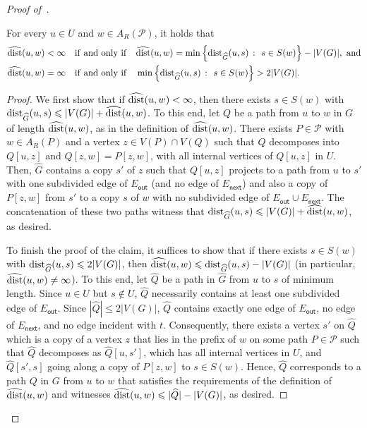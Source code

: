 \begin{proof}[Proof of~]
  \begin{claim}\label{cl:dist2}
    For every $u \in U$ and $w \in A_R(\mathcal{P})$, it holds that
    \begin{align*}
    \widehat{\dist}(u,w) < \infty &\quad\mathrm{if\ and\ only\ if} \quad \widehat{\dist}(u,w) = \min\left\{\dist_{\widehat{G}}(u,s)~\colon~s \in S(w)\right\}-|V(G)|,\ \mathrm{and}\\
    \widehat{\dist}(u,w) = \infty &\quad\mathrm{if\ and\ only\ if} \quad \min\left\{\dist_{\widehat{G}}(u,s)~\colon~s \in S(w)\right\} > 2|V(G)|.
    \end{align*}
  \end{claim}
  \begin{proof}
    We first show that if $\widehat{\mathrm{dist}}(u,w) < \infty$, then 
    there exists $s \in S(w)$ with $\mathrm{dist}_{\widehat{G}}(u,s) \leqslant |V(G)| + \widehat{\mathrm{dist}}(u,w)$. 
    To this end, let $Q$ be a path from $u$ to $w$ in $G$ of length $\widehat{\mathrm{dist}}(u,w)$, as in the definition
    of $\widehat{\mathrm{dist}}(u,w)$. There exists $P \in \mathcal{P}$ with $w \in A_R(P)$ and a vertex $z \in V(P) \cap V(Q)$
    such that $Q$ decomposes into $Q[u,z]$ and $Q[z,w] = P[z,w]$, with all internal vertices of $Q[u,z]$ in $U$. 
    Then, $\widehat{G}$ contains a copy $s'$ of $z$ such that $Q[u,z]$ projects to a path from $u$ to $s'$
    with one subdivided edge of $E_{\mathsf{out}}$ (and no edge of $E_{\mathsf{next}}$) and also a copy of $P[z,w]$ from $s'$
    to a copy $s$ of $w$ with no subdivided edge of $E_{\mathsf{out}} \cup E_{\mathsf{next}}$.
    The concatenation of these two paths witness that $\mathrm{dist}_{\widehat{G}}(u,s) \leqslant |V(G)| + \widehat{\mathrm{dist}}(u,w)$, as desired.

    To finish the proof of the claim, it suffices to show that if there exists $s \in S(w)$ with
    $\mathrm{dist}_{\widehat{G}}(u,s) \leqslant 2|V(G)|$, then $\widehat{\mathrm{dist}}(u,w) \leqslant \mathrm{dist}_{\widehat{G}}(u,s) - |V(G)|$
    (in particular, $\widehat{\mathrm{dist}}(u,w) \neq \infty$).
    To this end, let $\widehat{Q}$ be a path in $\widehat{G}$ from $u$ to $s$ of minimum length. 
    Since $u \in U$ but $s \notin U$, $\widehat{Q}$ necessarily contains at least one subdivided edge of $E_{\mathsf{out}}$. 
    Since $|\widehat{Q}| \leq 2|V(G)|$, $\widehat{Q}$ contains exactly one edge of $E_{\mathsf{out}}$, no edge of 
    $E_{\mathsf{next}}$, and no edge incident with $t$. Consequently, there exists a vertex $s'$ on $\widehat{Q}$
    which is a copy of a vertex $z$ that lies in the prefix of $w$ on some path $P \in \mathcal{P}$ such that 
    $\widehat{Q}$ decomposes as $\widehat{Q}[u,s']$, which has all internal vertices in $U$, and $\widehat{Q}[s',s]$
    going along a copy of $P[z,w]$ to $s \in S(w)$. Hence, $\widehat{Q}$ corresponds to a path $Q$ in $G$
    from $u$ to $w$ that satisfies the requirements of the definition of $\widehat{\mathrm{dist}}(u,w)$
    and witnesses $\widehat{\mathrm{dist}}(u,w) \leqslant |\widehat{Q}| - |V(G)|$, as desired. 


\end{proof}
\end{proof}
